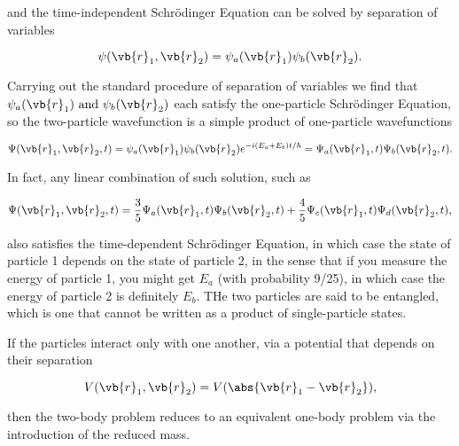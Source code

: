 \documentclass[a4paper,12pt]{report}
\begin{document}
and the time-independent Schrödinger Equation can be solved by separation of variables 

\begin{equation}
  \psi (\vb{r} _{1},\vb{r} _{2}  ) = \psi _{a}(\vb{r} _{1} )\psi _{b}(\vb{r} _{2} ).  
\end{equation}

Carrying out the standard procedure of separation of variables we find that \(\psi _{a}(\vb{r} _{1} ) \text { and } \psi _{b}(\vb{r} _{2} )  \) each satisfy the one-particle Schrödinger Equation, so the two-particle wavefunction is a simple product of one-particle wavefunctions

\begin{equation}
  \Psi (\vb{r} _{1},\vb{r} _{2},t  ) = \psi _{a}(\vb{r} _{1} )\psi _{b}(\vb{r} _{2} ) e^{-i (E_{a}+E_{b}  )t /\hbar } = \Psi _{a}(\vb{r} _{1},t )\Psi _{b}(\vb{r} _{2},t ).    
\end{equation}

In fact, any linear combination of such solution, such as 

\begin{equation}
  \Psi (\vb{r} _{1},\vb{r} _{2},t  ) = \frac{3}{5} \Psi _{a}(\vb{r} _{1} ,t) \Psi _{b}(\vb{r} _{2},t ) + \frac{4}{5} \Psi _{c}(\vb{r} _{1},t ) \Psi _{d}(\vb{r} _{2},t ),    
\end{equation}

also satisfies the time-dependent Schrödinger Equation, in which case the state of particle 1 depends on the state of particle 2, in the sense that if you measure the energy of particle 1, you might get \(E_{a} \) (with probability 9/25), in which case the energy of particle 2 is definitely \(E_{b} \). THe two particles are said to be entangled, which is one that cannot be written as a product of single-particle states.  

If the particles interact only with one another, via a potential that depends on their separation 

\begin{equation}
  V(\vb{r} _{1}, \vb{r} _{2}  ) = V(\abs{\vb{r} _{1}-\vb{r} _{2}  } ), 
\end{equation}

then the two-body problem reduces to an equivalent one-body problem via the introduction of the reduced mass.
\end{document}
